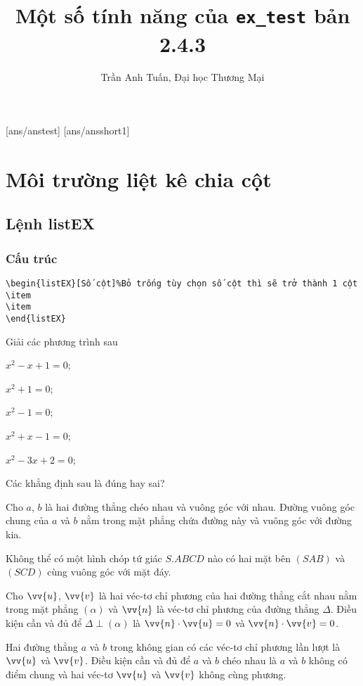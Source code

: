 \documentclass[12pt,a4paper,oneside]{article}
\def\vec{\vv}
\begin{document}
[ans/anstest]
[ans/ansshort1]
	\title{Một số tính năng của  \texttt{ex\_test} bản 2.4.3}
	\author{Trần Anh Tuấn, Đại học Thương Mại}
	\maketitle
\section{Môi trường liệt kê chia cột}
\subsection{Lệnh listEX}
\subsubsection{Cấu trúc}
\begin{verbatim}
\begin{listEX}[Số cột]%Bỏ trống tùy chọn số cột thì sẽ trở thành 1 cột
\item 
\item 
\end{listEX}
\end{verbatim}
\begin{ex}
Giải các phương trình sau
\begin{listEX}[3]
\item $x^2-x+1=0$;
\item $x^2+1=0$;
\item $x^2-1=0$;
\item $x^2+x-1=0$;
\item $x^2-3x+2=0$;
\end{listEX}
\end{ex}
\begin{ex}
Các khẳng định sau là đúng hay sai?
\begin{listEX}
	\item Cho $a$, $b$ là hai đường thẳng chéo nhau và vuông góc với nhau. Đường vuông góc chung của $a$ và $b$ nằm trong mặt phẳng chứa đường này và vuông góc với đường kia. 
	\item Không thể có một hình chóp tứ giác $S.ABCD$ nào có hai mặt bên $(SAB)$ và $(SCD)$ cùng vuông góc với mặt đáy.
	\item Cho $\vec{u}$, $\vec{v}$ là hai véc-tơ chỉ phương của hai đường thẳng cắt nhau nằm trong mặt phẳng $(\alpha)$ và $\vec{n}$ là véc-tơ chỉ phương của đường thẳng $\Delta$. Điều kiện cần và đủ để $\Delta\perp(\alpha)$ là $\vec{n}\cdot\vec{u}=0$ và $\vec{n}\cdot\vec{v}=0$.
	\item Hai đường thẳng $a$ và $b$ trong không gian có các véc-tơ chỉ phương lần lượt là $\vec{u}$ và $\vec{v}$. Điều kiện cần và đủ để $a$ và $b$ chéo nhau là $a$ và $b$ không có điểm chung và hai véc-tơ $\vec{u}$ và $\vec{v}$ không cùng phương.
\end{listEX}
\end{ex}
\end{document}
